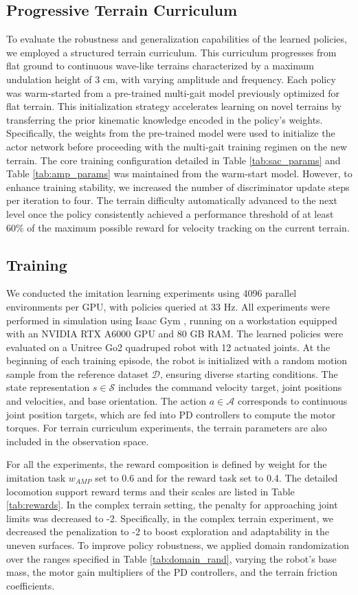 \documentclass[letterpaper, 10pt, conference]{IEEEtran}
\begin{document}
\subsection{Progressive Terrain Curriculum}
To evaluate the robustness and generalization capabilities of the learned policies, we employed a structured terrain curriculum. This curriculum progresses from flat ground to continuous wave-like terrains characterized by a maximum undulation height of 3 cm, with varying amplitude and frequency. Each policy was warm-started from a pre-trained multi-gait model previously optimized for flat terrain. This initialization strategy accelerates learning on novel terrains by transferring the prior kinematic knowledge encoded in the policy's weights. Specifically, the weights from the pre-trained model were used to initialize the actor network before proceeding with the multi-gait training regimen on the new terrain. The core training configuration detailed in Table \ref{tab:sac_params} and Table \ref{tab:amp_params} was maintained from the warm-start model. However, to enhance training stability, we increased the number of discriminator update steps per iteration to four. The terrain difficulty automatically advanced to the next level once the policy consistently achieved a performance threshold of at least 60\% of the maximum possible reward for velocity tracking on the current terrain.

\subsection{Training}
We conducted the imitation learning experiments using 4096 parallel environments per GPU, with policies queried at 33 Hz. All experiments were performed in simulation using Isaac Gym \cite{Liang2018}, running on a workstation equipped with an NVIDIA RTX A6000 GPU and 80 GB RAM. The learned policies were evaluated on a Unitree Go2 quadruped robot with 12 actuated joints. At the beginning of each training episode, the robot is initialized with a random motion sample from the reference dataset $\mathcal{D}$, ensuring diverse starting conditions. The state representation $s\in \mathcal{S}$ includes the command velocity target, joint positions and velocities, and base orientation. The action $a\in\mathcal{A}$ corresponds to continuous joint position targets, which are fed into PD controllers to compute the motor torques. For terrain curriculum experiments, the terrain parameters are also included in the observation space.

For all the experiments, the reward composition is defined by weight for the imitation task $w_{AMP}$ set to 0.6 and for the reward task set to 0.4. The detailed locomotion support reward terms and their scales are listed in Table \ref{tab:rewards}. In the complex terrain setting, the penalty for approaching joint limits was decreased to -2. Specifically, in the complex terrain experiment, we decreased the penalization to -2 to boost exploration and adaptability in the uneven surfaces. To improve policy robustness, we applied domain randomization over the ranges specified in Table \ref{tab:domain_rand}, varying the robot's base mass, the motor gain multipliers of the PD controllers, and the terrain friction coefficients.
\end{document}
